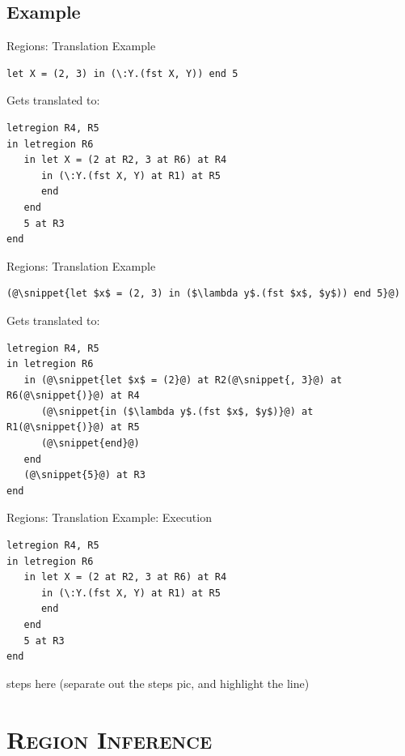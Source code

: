 \documentclass[xcolor=x11names,compress]{beamer}
\newcommand{\snippet}[1] {\textcolor{code}{\texttt{#1}}}
\renewcommand{\(}{\begin{columns}}
\renewcommand{\)}{\end{columns}}
\newcommand{\<}[1]{\begin{column}{#1}}
\renewcommand{\>}{\end{column}}
\begin{document}
\subsection{Example}

\begin{frame}[fragile]{Regions: Translation Example}
\begin{lstlisting}
let X = (2, 3) in (\:Y.(fst X, Y)) end 5
\end{lstlisting}
\pause
Gets translated to:

\begin{lstlisting}
letregion R4, R5
in letregion R6
   in let X = (2 at R2, 3 at R6) at R4
      in (\:Y.(fst X, Y) at R1) at R5
      end
   end
   5 at R3
end
\end{lstlisting}
\end{frame}

\begin{frame}[fragile]{Regions: Translation Example}
\begin{lstlisting}
(@\snippet{let $x$ = (2, 3) in ($\lambda y$.(fst $x$, $y$)) end 5}@)
\end{lstlisting}

Gets translated to:

\begin{lstlisting}
letregion R4, R5
in letregion R6
   in (@\snippet{let $x$ = (2}@) at R2(@\snippet{, 3}@) at R6(@\snippet{)}@) at R4
      (@\snippet{in ($\lambda y$.(fst $x$, $y$)}@) at R1(@\snippet{)}@) at R5
      (@\snippet{end}@)
   end
   (@\snippet{5}@) at R3
end
\end{lstlisting}
\end{frame}

\begin{frame}[fragile]{Regions: Translation Example: Execution}
\begin{lstlisting}
letregion R4, R5
in letregion R6
   in let X = (2 at R2, 3 at R6) at R4
      in (\:Y.(fst X, Y) at R1) at R5
      end
   end
   5 at R3
end
\end{lstlisting}

steps here (separate out the steps pic, and highlight the line)

\end{frame}

\section{\scshape Region Inference}
\end{document}
